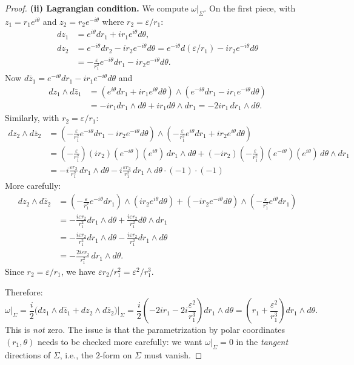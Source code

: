 \documentclass[12pt]{article}
\newcommand{\eps}{\varepsilon}
\newcommand{\om}{\omega}
\begin{document}
\begin{proof}
\textbf{(ii) Lagrangian condition.} We compute $\om|_\Sigma$. On the first piece, with $z_1 = r_1 e^{i\theta}$ and $z_2 = r_2 e^{-i\theta}$ where $r_2 = \eps/r_1$:
\begin{align*}
  dz_1 &= e^{i\theta}dr_1 + ir_1 e^{i\theta}d\theta, \\
  dz_2 &= e^{-i\theta}dr_2 - ir_2 e^{-i\theta}d\theta = e^{-i\theta}d(\eps/r_1) - ir_2 e^{-i\theta}d\theta \\
       &= -\frac{\eps}{r_1^2}e^{-i\theta}dr_1 - ir_2 e^{-i\theta}d\theta.
\end{align*}
Now $d\bar z_1 = e^{-i\theta}dr_1 - ir_1 e^{-i\theta}d\theta$ and
\begin{align*}
  dz_1 \wedge d\bar z_1 &= (e^{i\theta}dr_1 + ir_1 e^{i\theta}d\theta)\wedge(e^{-i\theta}dr_1 - ir_1 e^{-i\theta}d\theta) \\
  &= -ir_1 dr_1 \wedge d\theta + ir_1 d\theta \wedge dr_1 = -2ir_1\, dr_1 \wedge d\theta.
\end{align*}
Similarly, with $r_2 = \eps/r_1$:
\begin{align*}
  dz_2 \wedge d\bar z_2 &= \left(-\frac{\eps}{r_1^2}e^{-i\theta}dr_1 - ir_2 e^{-i\theta}d\theta\right) \wedge \left(-\frac{\eps}{r_1^2}e^{i\theta}dr_1 + ir_2 e^{i\theta}d\theta\right) \\
  &= \left(-\frac{\eps}{r_1^2}\right)(ir_2)(e^{-i\theta})(e^{i\theta})\,dr_1\wedge d\theta + (-ir_2)\left(-\frac{\eps}{r_1^2}\right)(e^{-i\theta})(e^{i\theta})\,d\theta\wedge dr_1 \\
  &= -i\frac{\eps r_2}{r_1^2}\,dr_1\wedge d\theta - i\frac{\eps r_2}{r_1^2}\,dr_1\wedge d\theta \cdot (-1) \cdot(-1)
\end{align*}
More carefully:
\begin{align*}
  dz_2 \wedge d\bar z_2 &= \left(-\frac{\eps}{r_1^2}e^{-i\theta}dr_1\right)\wedge \left(ir_2 e^{i\theta}d\theta\right) + \left(-ir_2 e^{-i\theta}d\theta\right)\wedge \left(-\frac{\eps}{r_1^2}e^{i\theta}dr_1\right) \\
  &= -\frac{i\eps r_2}{r_1^2}dr_1\wedge d\theta + \frac{i\eps r_2}{r_1^2}d\theta\wedge dr_1 \\
  &= -\frac{i\eps r_2}{r_1^2}dr_1\wedge d\theta - \frac{i\eps r_2}{r_1^2}dr_1\wedge d\theta \\
  &= -\frac{2i\eps r_2}{r_1^2}\,dr_1\wedge d\theta.
\end{align*}
Since $r_2 = \eps/r_1$, we have $\eps r_2/r_1^2 = \eps^2/r_1^3$.

Therefore:
\[
  \om|_\Sigma = \frac{i}{2}\bigl(dz_1\wedge d\bar z_1 + dz_2\wedge d\bar z_2\bigr)\big|_\Sigma
  = \frac{i}{2}\left(-2ir_1 - 2i\frac{\eps^2}{r_1^3}\right)dr_1\wedge d\theta
  = \left(r_1 + \frac{\eps^2}{r_1^3}\right)dr_1\wedge d\theta.
\]
This is \emph{not} zero. The issue is that the parametrization by polar coordinates $(r_1, \theta)$ needs to be checked more carefully: we want $\om|_\Sigma = 0$ in the \emph{tangent} directions of $\Sigma$, i.e., the $2$-form on $\Sigma$ must vanish.


\end{proof}
\end{document}
